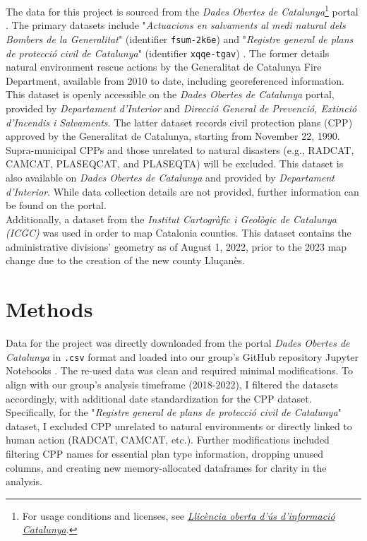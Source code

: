 \documentclass[
  journal=small,
  manuscript=mini-article,  %
  year=2023,
  volume=1,
]{odj-journal}
\begin{document}
The data for this project is sourced from the \textit{Dades Obertes de Catalunya}\footnote{For usage conditions and licenses, see \href{https://governobert.gencat.cat/ca/dades_obertes/llicencia-oberta-informacio-catalunya/}{\textit{Llicència oberta d'ús d'informació Catalunya}}.} portal \cite{dades_obertes}. The primary datasets include "\textit{Actuacions en salvaments al medi natural dels Bombers de la Generalitat}" (identifier \texttt{fsum-2k6e}) \cite{fd_rescue} and "\textit{Registre general de plans de protecció civil de Catalunya}" (identifier \texttt{xqqe-tgav}) \cite{CPP}. The former details natural environment rescue actions by the Generalitat de Catalunya Fire Department, available from 2010 to date, including georeferenced information. This dataset is openly accessible on the \textit{Dades Obertes de Catalunya} portal, provided by \textit{Departament d'Interior} and \textit{Direcció General de Prevenció, Extinció d'Incendis i Salvaments}. The latter dataset records civil protection plans (CPP) approved by the Generalitat de Catalunya, starting from November 22, 1990. Supra-municipal CPPs and those unrelated to natural disasters (e.g., RADCAT, CAMCAT, PLASEQCAT, and PLASEQTA) will be excluded. This dataset is also available on \textit{Dades Obertes de Catalunya} and provided by \textit{Departament d'Interior}. While data collection details are not provided, further information can be found on the portal.\\

Additionally, a dataset from the \textit{Institut Cartogràfic i Geològic de Catalunya (ICGC)} \cite{geo_dades} was used in order to map Catalonia counties. This dataset contains the administrative divisions' geometry as of August 1, 2022, prior to the 2023 map change due to the creation of the new county Lluçanès.

\section{Methods}\label{sec:methods}
Data for the project was directly downloaded from the portal \textit{Dades Obertes de Catalunya} in \texttt{.csv} format and loaded into our group's GitHub repository Jupyter Notebooks \cite{github_repo}. The re-used data was clean and required minimal modifications. To align with our group's analysis timeframe (2018-2022), I filtered the datasets accordingly, with additional date standardization for the CPP dataset. Specifically, for the "\textit{Registre general de plans de protecció civil de Catalunya}" dataset, I excluded CPP unrelated to natural environments or directly linked to human action (RADCAT, CAMCAT, etc.). Further modifications included filtering CPP names for essential plan type information, dropping unused columns, and creating new memory-allocated dataframes for clarity in the analysis.\\
\end{document}
